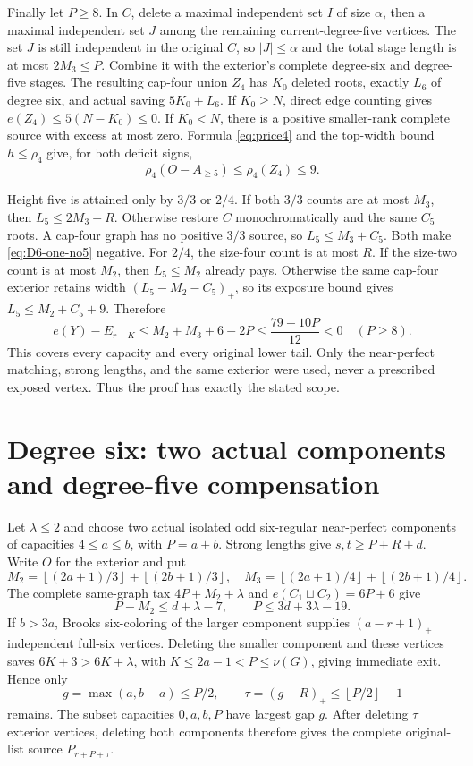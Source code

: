 \documentclass[11pt,a4paper]{article}
\newcommand{\floor}[1]{\left\lfloor#1\right\rfloor}
\theoremstyle{definition}
\begin{document}
Finally let $P\ge8$. In $C$, delete a maximal independent set $I$ of size $\alpha$, then a maximal independent set $J$ among the remaining current-degree-five vertices. The set $J$ is still independent in the original $C$, so $|J|\le\alpha$ and the total stage length is at most $2M_3\le P$. Combine it with the exterior's complete degree-six and degree-five stages. The resulting cap-four union $Z_4$ has $K_0$ deleted roots, exactly $L_6$ of degree six, and actual saving $5K_0+L_6$. If $K_0\ge N$, direct edge counting gives $e(Z_4)\le5(N-K_0)\le0$. If $K_0<N$, there is a positive smaller-rank complete source with excess at most zero. Formula \eqref{eq:price4} and the top-width bound $h\le\rho_4$ give, for both deficit signs,
\[
 \rho_4(O-A_{\ge5})\le\rho_4(Z_4)\le9.
\]

Height five is attained only by $3/3$ or $2/4$. If both $3/3$ counts are at most $M_3$, then $L_5\le2M_3-R$. Otherwise restore $C$ monochromatically and the same $C_5$ roots. A cap-four graph has no positive $3/3$ source, so $L_5\le M_3+C_5$. Both make \eqref{eq:D6-one-no5} negative. For $2/4$, the size-four count is at most $R$. If the size-two count is at most $M_2$, then $L_5\le M_2$ already pays. Otherwise the same cap-four exterior retains width $(L_5-M_2-C_5)_+$, so its exposure bound gives $L_5\le M_2+C_5+9$. Therefore
\[
 e(Y)-E_{r+K}\le M_2+M_3+6-2P
 \le \frac{79-10P}{12}<0\quad(P\ge8).
\]
This covers every capacity and every original lower tail. Only the near-perfect matching, strong lengths, and the same exterior were used, never a prescribed exposed vertex. Thus the proof has exactly the stated scope.

\section{Degree six: two actual components and degree-five compensation}\label{app:D6-two}
Let $\lambda\le2$ and choose two actual isolated odd six-regular near-perfect components of capacities $4\le a\le b$, with $P=a+b$. Strong lengths give $s,t\ge P+R+d$. Write $O$ for the exterior and put
\[
 M_2=\floor{(2a+1)/3}+\floor{(2b+1)/3},\quad
 M_3=\floor{(2a+1)/4}+\floor{(2b+1)/4}.
\]
The complete same-graph tax $4P+M_2+\lambda$ and $e(C_1\sqcup C_2)=6P+6$ give
\begin{equation}\label{eq:D6-two-bound}
 P-M_2\le d+\lambda-7,\qquad P\le3d+3\lambda-19.
\end{equation}
If $b>3a$, Brooks six-coloring of the larger component supplies $(a-r+1)_+$ independent full-six vertices. Deleting the smaller component and these vertices saves $6K+3>6K+\lambda$, with $K\le2a-1<P\le\nu(G)$, giving immediate exit. Hence only
\[
 g=\max(a,b-a)\le P/2,\qquad
 \tau=(g-R)_+\le\floor{P/2}-1
\]
remains. The subset capacities $0,a,b,P$ have largest gap $g$. After deleting $\tau$ exterior vertices, deleting both components therefore gives the complete original-list source $P_{r+P+\tau}$.
\end{document}

